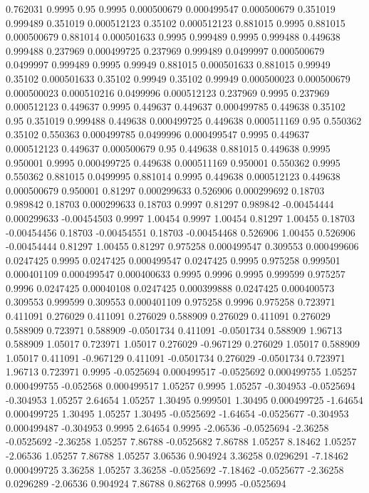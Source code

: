 0.762031 0.9995
0.95 0.9995
0.000500679 0.000499547
0.000500679 0.351019
0.999489 0.351019
0.000512123 0.35102
0.000512123 0.881015
0.9995 0.881015
0.000500679 0.881014
0.000501633 0.9995
0.999489 0.9995
0.999488 0.449638
0.999488 0.237969
0.000499725 0.237969
0.999489 0.0499997
0.000500679 0.0499997
0.999489 0.9995
0.99949 0.881015
0.000501633 0.881015
0.99949 0.35102
0.000501633 0.35102
0.99949 0.35102
0.99949 0.000500023
0.000500679 0.000500023
0.000510216 0.0499996
0.000512123 0.237969
0.9995 0.237969
0.000512123 0.449637
0.9995 0.449637
0.449637 0.000499785
0.449638 0.35102
0.95 0.351019
0.999488 0.449638
0.000499725 0.449638
0.000511169 0.95
0.550362 0.35102
0.550363 0.000499785
0.0499996 0.000499547
0.9995 0.449637
0.000512123 0.449637
0.000500679 0.95
0.449638 0.881015
0.449638 0.9995
0.950001 0.9995
0.000499725 0.449638
0.000511169 0.950001
0.550362 0.9995
0.550362 0.881015
0.0499995 0.881014
0.9995 0.449638
0.000512123 0.449638
0.000500679 0.950001
0.81297 0.000299633
0.526906 0.000299692
0.18703 0.989842
0.18703 0.000299633
0.18703 0.9997
0.81297 0.989842
-0.00454444 0.000299633
-0.00454503 0.9997
1.00454 0.9997
1.00454 0.81297
1.00455 0.18703
-0.00454456 0.18703
-0.00454551 0.18703
-0.00454468 0.526906
1.00455 0.526906
-0.00454444 0.81297
1.00455 0.81297
0.975258 0.000499547
0.309553 0.000499606
0.0247425 0.9995
0.0247425 0.000499547
0.0247425 0.9995
0.975258 0.999501
0.000401109 0.000499547
0.000400633 0.9995
0.9996 0.9995
0.999599 0.975257
0.9996 0.0247425
0.00040108 0.0247425
0.000399888 0.0247425
0.000400573 0.309553
0.999599 0.309553
0.000401109 0.975258
0.9996 0.975258
0.723971 0.411091
0.276029 0.411091
0.276029 0.588909
0.276029 0.411091
0.276029 0.588909
0.723971 0.588909
-0.0501734 0.411091
-0.0501734 0.588909
1.96713 0.588909
1.05017 0.723971
1.05017 0.276029
-0.967129 0.276029
1.05017 0.588909
1.05017 0.411091
-0.967129 0.411091
-0.0501734 0.276029
-0.0501734 0.723971
1.96713 0.723971
0.9995 -0.0525694
0.000499517 -0.0525692
0.000499755 1.05257
0.000499755 -0.052568
0.000499517 1.05257
0.9995 1.05257
-0.304953 -0.0525694
-0.304953 1.05257
2.64654 1.05257
1.30495 0.999501
1.30495 0.000499725
-1.64654 0.000499725
1.30495 1.05257
1.30495 -0.0525692
-1.64654 -0.0525677
-0.304953 0.000499487
-0.304953 0.9995
2.64654 0.9995
-2.06536 -0.0525694
-2.36258 -0.0525692
-2.36258 1.05257
7.86788 -0.0525682
7.86788 1.05257
8.18462 1.05257
-2.06536 1.05257
7.86788 1.05257
3.06536 0.904924
3.36258 0.0296291
-7.18462 0.000499725
3.36258 1.05257
3.36258 -0.0525692
-7.18462 -0.0525677
-2.36258 0.0296289
-2.06536 0.904924
7.86788 0.862768
0.9995 -0.0525694
